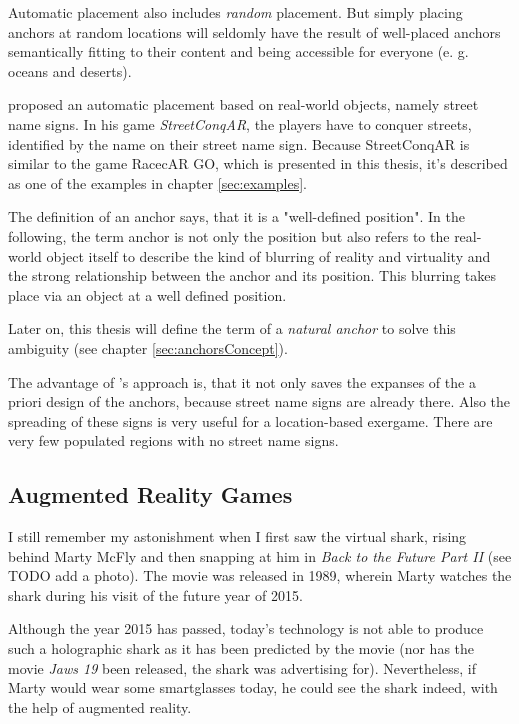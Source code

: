 Automatic placement also includes \emph{random} placement. But simply placing anchors at random locations will seldomly have the result of well-placed anchors semantically fitting to their content and being accessible for everyone (e. g. oceans and deserts).

\citeauthor{hock2014augmented} proposed an automatic placement based on real-world objects, namely street name signs. In his game \emph{StreetConqAR}, the players have to conquer streets, identified by the name on their street name sign. Because StreetConqAR is similar to the game RacecAR GO, which is presented in this thesis, it's described as one of the examples in chapter \ref{sec:examples}.

The definition of an anchor says, that it is a "well-defined position". In the following, the term anchor is not only the position but also refers to the real-world object itself to describe the kind of blurring of reality and virtuality and the strong relationship between the anchor and its position. This blurring takes place via an object at a well defined position.

Later on, this thesis will define the term of a \emph{natural anchor} to solve this ambiguity (see chapter \ref{sec:anchorsConcept}).

The advantage of \citeauthor{hock2014augmented}'s approach is, that it not only saves the expanses of the a priori design of the anchors, because street name signs are already there. Also the spreading of these signs is very useful for a location-based exergame. There are very few populated regions with no street name signs.

\subsection{Augmented Reality Games}\label{sec:augmentedRealityStateOfTheArt}
I still remember my astonishment when I first saw the virtual shark, rising behind Marty McFly and then snapping at him in \emph{Back to the Future Part II} (see TODO add a photo). The movie was released in 1989, wherein Marty watches the shark during his visit of the future year of 2015.

Although the year 2015 has passed, today's technology is not able to produce such a holographic shark as it has been predicted by the movie (nor has the movie \emph{Jaws 19} been released, the shark was advertising for).
Nevertheless, if Marty would wear some smartglasses today, he could see the shark indeed, with the help of augmented reality.

